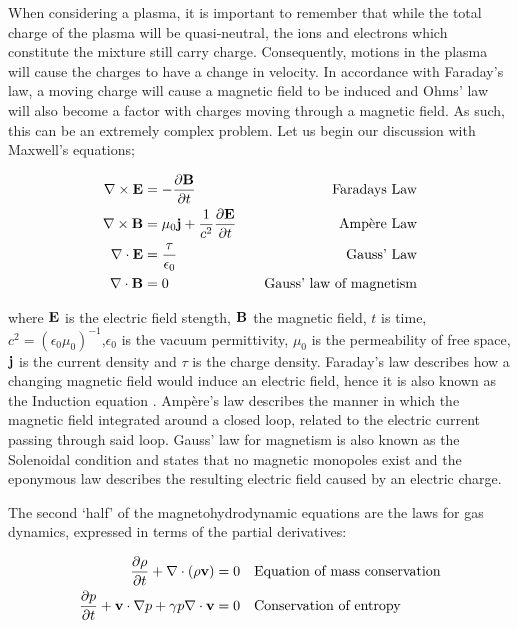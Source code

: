 When considering a plasma, it is important to remember that while the total charge of the plasma will be quasi-neutral, the ions and electrons which constitute the mixture still carry charge.
Consequently, motions in the plasma will cause the charges to have a change in velocity.
In accordance with Faraday's law, a moving charge will cause a magnetic field to be induced and Ohms' law will also become a factor with charges moving through a magnetic field.
As such, this can be an extremely complex problem. 
Let us begin our discussion with Maxwell's equations;

\begin{align}
	\nabla \times \mathbf{E} &= -\frac{\partial \mathbf{B}}{\partial t }  &\quad \textnormal{Faradays Law}\\
	\nabla \times \mathbf{B} &= \mu_0\mathbf{j} + \frac{1}{c^2}\frac{\partial \mathbf{E}}{\partial t } &\quad \textnormal{Amp{\`e}re Law}\\
	\nabla\cdot\mathbf{E} &= \frac{\tau}{\epsilon_0} &\quad \textnormal{Gauss' Law}\\
	\nabla\cdot\mathbf{B} &= 0 & \quad \textnormal{Gauss' law of magnetism}\\
\end{align}

\noindent where $\mathbf{E}$ is the electric field stength, $\mathbf{B}$ the magnetic field, $t$ is time, $c^2 = (\epsilon_0\mu_0)^{-1}$,$\epsilon_0$ is the vacuum permittivity, $\mu_0$ is the permeability of free space, $\mathbf{j}$ is the current density and $\tau$ is the charge density.
Faraday's law describes how a changing magnetic field would induce an electric field, hence it is also known as the Induction equation \citep{Goedbloed2004}.
Amp{\`e}re's law describes the manner in which the magnetic field integrated around a closed loop, related to the electric current passing through said loop.
Gauss' law for magnetism is also known as the Solenoidal condition and states that no magnetic monopoles exist and the eponymous law describes the resulting electric field caused by an electric charge.

The second `half' of the magnetohydrodynamic equations are the laws for gas dynamics, expressed in terms of the partial derivatives:

\begin{align}
	\frac{\partial \rho}{\partial t } + \nabla \cdot (\rho\mathbf{v}) = 0 & \quad\textnormal{Equation of mass conservation}\\
	\frac{\partial p}{\partial t } + \mathbf{v}\cdot\nabla p + \gamma p\nabla\cdot\mathbf{v} = 0 & \quad \textnormal{Conservation of entropy}
\end{align}

